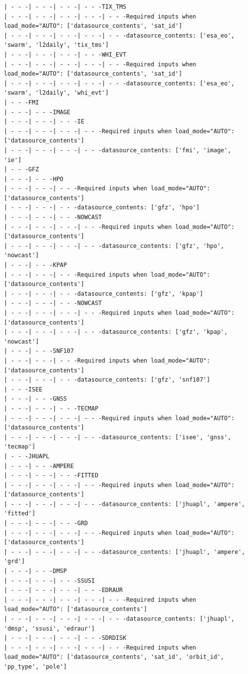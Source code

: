 \begin{verbatim}
| - - -| - - -| - - -| - - -TIX_TMS
| - - -| - - -| - - -| - - -| - - -Required inputs when load_mode="AUTO": ['datasource_contents', 'sat_id']
| - - -| - - -| - - -| - - -| - - -datasource_contents: ['esa_eo', 'swarm', 'l2daily', 'tix_tms']
| - - -| - - -| - - -| - - -WHI_EVT
| - - -| - - -| - - -| - - -| - - -Required inputs when load_mode="AUTO": ['datasource_contents', 'sat_id']
| - - -| - - -| - - -| - - -| - - -datasource_contents: ['esa_eo', 'swarm', 'l2daily', 'whi_evt']
| - - -FMI
| - - -| - - -IMAGE
| - - -| - - -| - - -IE
| - - -| - - -| - - -| - - -Required inputs when load_mode="AUTO": ['datasource_contents']
| - - -| - - -| - - -| - - -datasource_contents: ['fmi', 'image', 'ie']
| - - -GFZ
| - - -| - - -HPO
| - - -| - - -| - - -Required inputs when load_mode="AUTO": ['datasource_contents']
| - - -| - - -| - - -datasource_contents: ['gfz', 'hpo']
| - - -| - - -| - - -NOWCAST
| - - -| - - -| - - -| - - -Required inputs when load_mode="AUTO": ['datasource_contents']
| - - -| - - -| - - -| - - -datasource_contents: ['gfz', 'hpo', 'nowcast']
| - - -| - - -KPAP
| - - -| - - -| - - -Required inputs when load_mode="AUTO": ['datasource_contents']
| - - -| - - -| - - -datasource_contents: ['gfz', 'kpap']
| - - -| - - -| - - -NOWCAST
| - - -| - - -| - - -| - - -Required inputs when load_mode="AUTO": ['datasource_contents']
| - - -| - - -| - - -| - - -datasource_contents: ['gfz', 'kpap', 'nowcast']
| - - -| - - -SNF107
| - - -| - - -| - - -Required inputs when load_mode="AUTO": ['datasource_contents']
| - - -| - - -| - - -datasource_contents: ['gfz', 'snf107']
| - - -ISEE
| - - -| - - -GNSS
| - - -| - - -| - - -TECMAP
| - - -| - - -| - - -| - - -Required inputs when load_mode="AUTO": ['datasource_contents']
| - - -| - - -| - - -| - - -datasource_contents: ['isee', 'gnss', 'tecmap']
| - - -JHUAPL
| - - -| - - -AMPERE
| - - -| - - -| - - -FITTED
| - - -| - - -| - - -| - - -Required inputs when load_mode="AUTO": ['datasource_contents']
| - - -| - - -| - - -| - - -datasource_contents: ['jhuapl', 'ampere', 'fitted']
| - - -| - - -| - - -GRD
| - - -| - - -| - - -| - - -Required inputs when load_mode="AUTO": ['datasource_contents']
| - - -| - - -| - - -| - - -datasource_contents: ['jhuapl', 'ampere', 'grd']
| - - -| - - -DMSP
| - - -| - - -| - - -SSUSI
| - - -| - - -| - - -| - - -EDRAUR
| - - -| - - -| - - -| - - -| - - -Required inputs when load_mode="AUTO": ['datasource_contents']
| - - -| - - -| - - -| - - -| - - -datasource_contents: ['jhuapl', 'dmsp', 'ssusi', 'edraur']
| - - -| - - -| - - -| - - -SDRDISK
| - - -| - - -| - - -| - - -| - - -Required inputs when load_mode="AUTO": ['datasource_contents', 'sat_id', 'orbit_id', 'pp_type', 'pole']

\end{verbatim}
